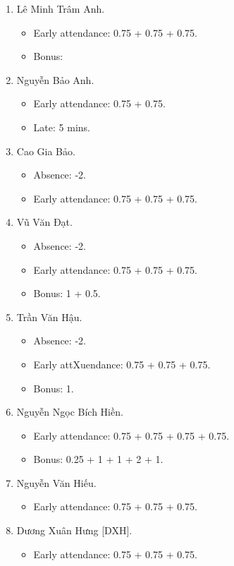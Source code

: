 \documentclass{article}
\begin{document}
\begin{enumerate}
	\item {\sc Lê Minh Trâm Anh.}
	\begin{itemize}
		\item Early attendance: 0.75 + 0.75 + 0.75.
		\item Bonus: 
	\end{itemize}
	\item {\sc Nguyễn Bảo Anh.}
	\begin{itemize}
		\item Early attendance: 0.75  + 0.75.
		\item Late: 5 mins.
	\end{itemize}
	\item {\sc Cao Gia Bảo.}
	\begin{itemize}
		\item Absence: -2.
		\item Early attendance: 0.75 + 0.75 + 0.75.
	\end{itemize}
	\item {\sc Vũ Văn Đạt.}
	\begin{itemize}
		\item Absence: -2.
		\item Early attendance: 0.75 + 0.75 + 0.75.
		\item Bonus: 1 + 0.5.
	\end{itemize}
	\item {\sc Trần Văn Hậu.}
	\begin{itemize}
		\item Absence: -2.
		\item Early attXuendance: 0.75 + 0.75 + 0.75.
		\item Bonus: 1.
	\end{itemize}
	\item {\sc Nguyễn Ngọc Bích Hiền.}
	\begin{itemize}
		\item Early attendance: 0.75 + 0.75 + 0.75 + 0.75.
		\item Bonus: 0.25 + 1 + 1 + 2 + 1.
	\end{itemize}
	\item {\sc Nguyễn Văn Hiếu.}
	\begin{itemize}
		\item Early attendance: 0.75 + 0.75 + 0.75.
	\end{itemize}
	\item {\sc Dương Xuân Hưng [DXH].}
	\begin{itemize}
		\item Early attendance: 0.75 + 0.75 + 0.75.

\end{itemize}
\end{enumerate}
\end{document}
